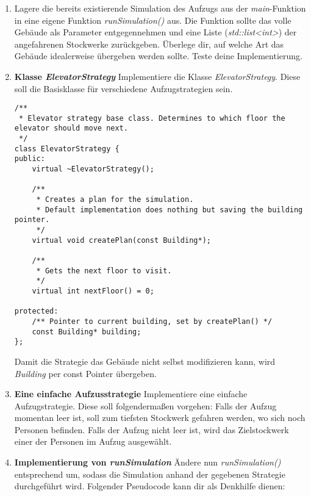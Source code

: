 \begin{enumerate}
\item
Lagere die bereits existierende Simulation des Aufzugs aus der \emph{main}-Funktion in eine eigene Funktion \emph{runSimulation()} aus. Die Funktion sollte das volle Gebäude als Parameter entgegennehmen und eine Liste (\emph{std::list<int>}) der angefahrenen Stockwerke zurückgeben. Überlege dir, auf welche Art das Gebäude idealerweise übergeben werden sollte.
Teste deine Implementierung.

\item \textbf{Klasse \emph{ElevatorStrategy}}
Implementiere die Klasse \emph{ElevatorStrategy}.
Diese soll die Basisklasse für verschiedene Aufzugstrategien sein.

\begin{lstlisting}
/**
 * Elevator strategy base class. Determines to which floor the elevator should move next.
 */
class ElevatorStrategy {
public:
	virtual ~ElevatorStrategy();

	/**
	 * Creates a plan for the simulation. 
	 * Default implementation does nothing but saving the building pointer.
	 */
	virtual void createPlan(const Building*);

	/** 
	 * Gets the next floor to visit.
	 */
	virtual int nextFloor() = 0;

protected:
	/** Pointer to current building, set by createPlan() */
	const Building* building;
};
\end{lstlisting}

Damit die Strategie das Gebäude nicht selbst modifizieren kann, wird \emph{Building} per const Pointer übergeben.

\item \textbf{Eine einfache Aufzusstrategie}
Implementiere eine einfache Aufzugstrategie.
Diese soll folgendermaßen vorgehen: 
Falls der Aufzug momentan leer ist, soll zum tiefsten Stockwerk gefahren werden, wo sich noch Personen befinden.
Falls der Aufzug nicht leer ist, wird das Zielstockwerk einer der Personen im Aufzug ausgewählt.

\item \textbf{Implementierung von \emph{runSimulation}}
Ändere nun \emph{runSimulation()} entsprechend um, sodass die Simulation anhand der gegebenen Strategie durchgeführt wird.
Folgender Pseudocode kann dir als Denkhilfe dienen: \\
\begin{algorithm}[H]
 \SetAlgoLined
\end{algorithm}
\end{enumerate}
